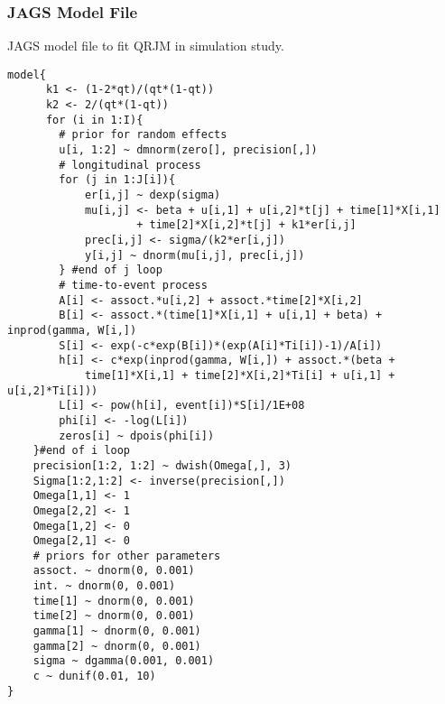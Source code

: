\doublespacing
\newpage
\subsubsection{\textsf{JAGS} Model File}\label{p1:jags_code}
\textsf{JAGS} model file to fit QRJM in simulation study.
{\scriptsize
\begin{verbatim}
model{
      k1 <- (1-2*qt)/(qt*(1-qt))
      k2 <- 2/(qt*(1-qt))
      for (i in 1:I){
        # prior for random effects
        u[i, 1:2] ~ dmnorm(zero[], precision[,])
        # longitudinal process
        for (j in 1:J[i]){
            er[i,j] ~ dexp(sigma)
            mu[i,j] <- beta + u[i,1] + u[i,2]*t[j] + time[1]*X[i,1]
                    + time[2]*X[i,2]*t[j] + k1*er[i,j]
            prec[i,j] <- sigma/(k2*er[i,j])
            y[i,j] ~ dnorm(mu[i,j], prec[i,j])
        } #end of j loop
        # time-to-event process
        A[i] <- assoct.*u[i,2] + assoct.*time[2]*X[i,2]
        B[i] <- assoct.*(time[1]*X[i,1] + u[i,1] + beta) + inprod(gamma, W[i,])
        S[i] <- exp(-c*exp(B[i])*(exp(A[i]*Ti[i])-1)/A[i])
        h[i] <- c*exp(inprod(gamma, W[i,]) + assoct.*(beta +
            time[1]*X[i,1] + time[2]*X[i,2]*Ti[i] + u[i,1] + u[i,2]*Ti[i]))
        L[i] <- pow(h[i], event[i])*S[i]/1E+08
        phi[i] <- -log(L[i])
        zeros[i] ~ dpois(phi[i])
    }#end of i loop
    precision[1:2, 1:2] ~ dwish(Omega[,], 3)
    Sigma[1:2,1:2] <- inverse(precision[,])
    Omega[1,1] <- 1
    Omega[2,2] <- 1
    Omega[1,2] <- 0
    Omega[2,1] <- 0
    # priors for other parameters
    assoct. ~ dnorm(0, 0.001)
    int. ~ dnorm(0, 0.001)
    time[1] ~ dnorm(0, 0.001)
    time[2] ~ dnorm(0, 0.001)
    gamma[1] ~ dnorm(0, 0.001)
    gamma[2] ~ dnorm(0, 0.001)
    sigma ~ dgamma(0.001, 0.001)
    c ~ dunif(0.01, 10)
}
\end{verbatim}
}
